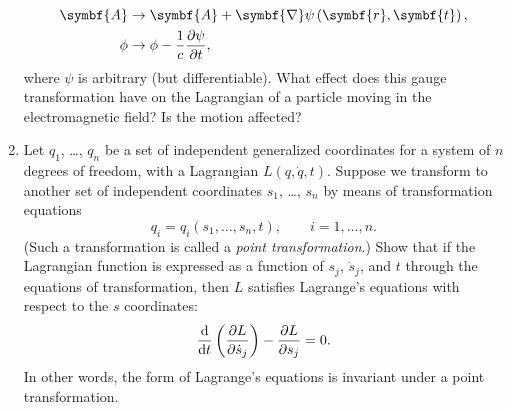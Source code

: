 \begin{enumerate}
    \begin{equation*}
        \begin{aligned}
            \symbf{A}&\to\symbf{A}+\symbf{\nabla}\psi\left(\symbf{r},\symbf{t}\right),\\
            \phi&\to\phi-\frac{1}{c}\pdv{\psi}{t},
        \end{aligned}
    \end{equation*}
    where \(\psi\) is arbitrary (but differentiable). What effect does this gauge transformation have on the Lagrangian of a particle moving in the electromagnetic field? Is the motion affected?
    \item Let \(q_1\), \ldots, \(q_n\) be a set of independent generalized coordinates for a system of \(n\) degrees of freedom, with a Lagrangian \(L\left(q,\dot{q},t\right)\). Suppose we transform to another set of independent coordinates \(s_1\), \ldots, \(s_n\) by means of transformation equations
    \begin{equation*}
        q_i=q_i\left(s_1,\ldots,s_n,t\right),\qquad i=1,\ldots,n.
    \end{equation*}
    (Such a transformation is called a \emph{point transformation}.) Show that if the Lagrangian function is expressed as a function of \(s_j\), \(\dot{s}_j\), and \(t\) through the equations of transformation, then \(L\) satisfies Lagrange's equations with respect to the \(s\) coordinates:
    \begin{equation*}
        \odv*{\left(\pdv{L}{\dot{s}_j}\right)}{t}-\pdv{L}{s_j}=0.
    \end{equation*}
    In other words, the form of Lagrange's equations is invariant under a point transformation. 
\end{enumerate}
